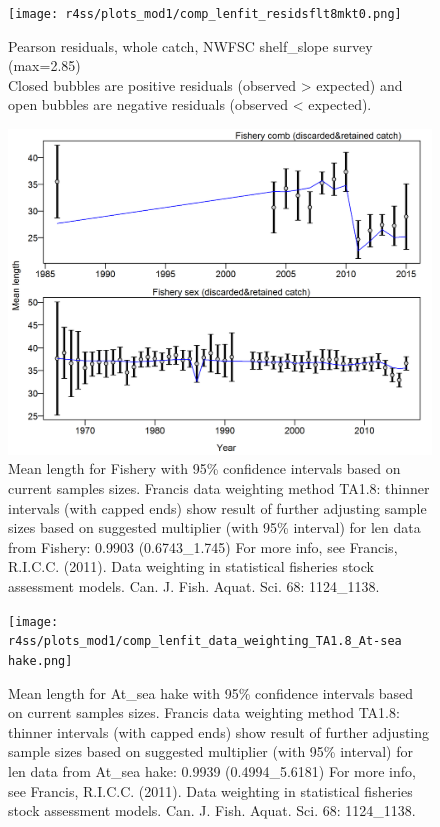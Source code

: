 \documentclass[12pt,]{article}
\begin{document}
\begin{figure}
\centering
\texttt{[image: r4ss/plots\_mod1/comp\_lenfit\_residsflt8mkt0.png]}
\caption{Pearson residuals, whole catch, NWFSC shelf\_slope survey
(max=2.85)\\
Closed bubbles are positive residuals (observed \textgreater{} expected)
and open bubbles are negative residuals (observed \textless{} expected).
\label{fig:nwfsc_combo_len_pearson}}
\end{figure}

\begin{figure}
\centering
\includegraphics{r4ss/plots_mod1/comp_lenfit_data_weighting_TA1.8_Fishery.png}
\caption{Mean length for Fishery with 95\% confidence intervals based on
current samples sizes. Francis data weighting method TA1.8: thinner
intervals (with capped ends) show result of further adjusting sample
sizes based on suggested multiplier (with 95\% interval) for len data
from Fishery: 0.9903 (0.6743\_1.745) For more info, see Francis,
R.I.C.C. (2011). Data weighting in statistical fisheries stock
assessment models. Can. J. Fish. Aquat. Sci. 68: 1124\_1138.
\label{fig:weighting_len_fishery}}
\end{figure}

\begin{figure}
\centering
\texttt{[image: r4ss/plots\_mod1/comp\_lenfit\_data\_weighting\_TA1.8\_At-sea hake.png]}
\caption{Mean length for At\_sea hake with 95\% confidence intervals
based on current samples sizes. Francis data weighting method TA1.8:
thinner intervals (with capped ends) show result of further adjusting
sample sizes based on suggested multiplier (with 95\% interval) for len
data from At\_sea hake: 0.9939 (0.4994\_5.6181) For more info, see
Francis, R.I.C.C. (2011). Data weighting in statistical fisheries stock
assessment models. Can. J. Fish. Aquat. Sci. 68: 1124\_1138.
\label{fig:weighting_len_ashop}}
\end{figure}
\end{document}
